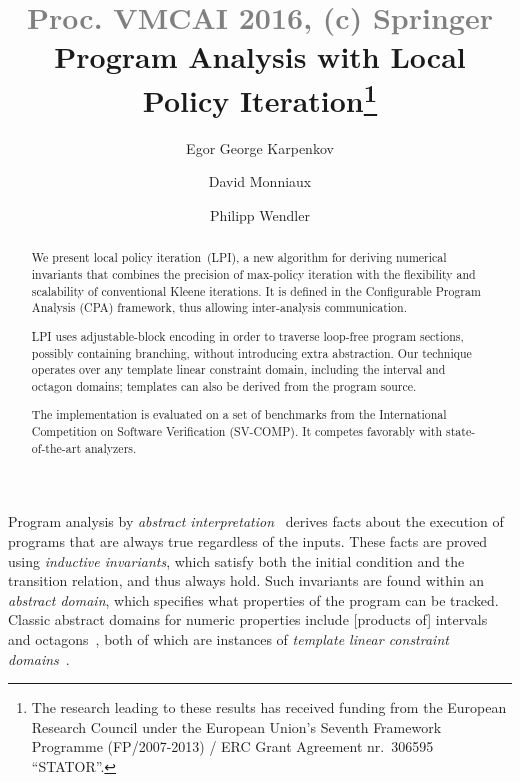 \documentclass{llncs}
\makeatletter
\newlength{\sectionspace}
\renewcommand\section{\@startsection{section}{1}{\z@}{-18\sectionspace \@plus -4\sectionspace \@minus -4\sectionspace}{12\sectionspace \@plus 4\sectionspace \@minus 4\sectionspace}{\normalfont\large\bfseries\boldmath
                        \rightskip=\z@ \@plus 8em\pretolerance=10000 }}
\makeatother
\begin{document}
\title{\textcolor{gray}{Proc. VMCAI 2016, (c) Springer} \\ Program Analysis with Local Policy Iteration\thanks{The research leading to these results has received funding from the
European Research Council under the European
Union's Seventh Framework Programme (FP/2007-2013) / ERC Grant Agreement
nr.~306595 \mbox{``STATOR''.}}}

\author{Egor George Karpenkov \and David Monniaux \and Philipp
    Wendler}

\maketitle


\begin{abstract}
We present local policy iteration~(LPI),
a new algorithm for deriving numerical invariants
that combines the precision of max-policy iteration with the flexibility
and scalability of conventional Kleene iterations.
It is defined in the Configurable Program Analysis (CPA)
framework, thus allowing inter-analysis communication.

LPI uses adjustable-block encoding in order to traverse loop-free program sections,
possibly containing branching, without introducing extra abstraction.
Our technique operates over any template linear constraint domain,
including the interval and octagon domains;
templates can also be derived from the program source.

The implementation is evaluated on a set of benchmarks from
the International Competition on Software Verification (SV-COMP).
It competes favorably with state-of-the-art analyzers.
\end{abstract}

\section{Introduction}
\label{sec:motivation}
Program analysis by \emph{abstract interpretation}~\cite{abstract_interpretation}
derives facts about the execution of programs
that are always true regardless of the inputs.
These facts are proved using \emph{inductive invariants},
which satisfy both the initial condition and the transition relation,
and thus always hold.
Such invariants are found within an \emph{abstract domain},
which specifies what properties of the program can be tracked.
Classic abstract domains for numeric properties include [products of] intervals
 and octagons~\cite{DBLP:journals/lisp/Mine06},
both of which are instances of \emph{template linear constraint domains}~\cite{template_constraints_domain}.
\end{document}

